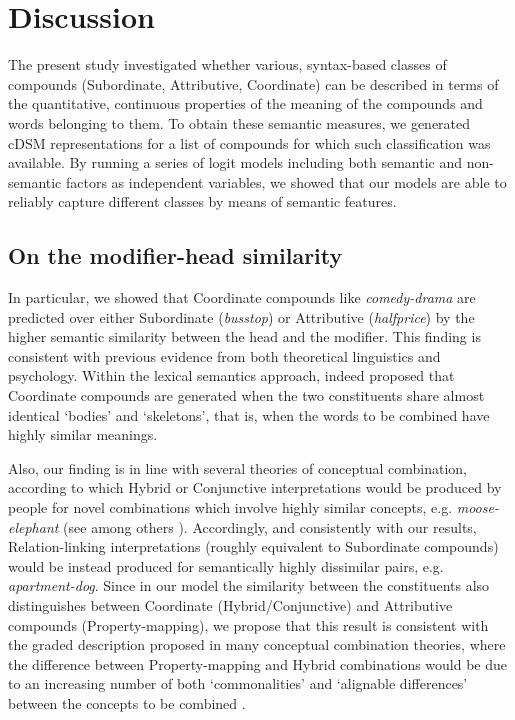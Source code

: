 \documentclass[output=paper]{langsci/langscibook}
\begin{document}
\section{Discussion}
\label{sec:pez:discussion}

The present study investigated whether various, syntax-based classes of compounds (Subordinate, Attributive, Coordinate) can be described in terms of the quantitative, continuous properties of the meaning of the compounds and words belonging to them. To obtain these semantic measures, we generated cDSM representations for a list of compounds for which such classification was available. By running a series of logit models including both semantic and non-semantic factors as independent variables, we showed that our models are able to reliably capture different classes by means of semantic features.

\subsection{On the modifier-head similarity}

In particular, we showed that Coordinate compounds like \emph{comedy-drama} are predicted over either Subordinate (\emph{busstop}) or Attributive (\emph{halfprice}) by the higher semantic similarity between the head and the modifier. This finding is consistent with previous evidence from both theoretical linguistics and psychology. Within the lexical semantics approach, \cite{lieber5OHC} indeed proposed that Coordinate compounds are generated when the two constituents share almost identical `bodies' and `skeletons', that is, when the words to be combined have highly similar meanings.

Also, our finding is in line with several theories of conceptual combination, according to which Hybrid or Conjunctive interpretations would be produced by people for novel combinations which involve highly similar concepts, e.g. \emph{moose-elephant} (see among others \citealt{wisniewski1996}). Accordingly, and consistently with our results, Relation-linking interpretations (roughly equivalent to Subordinate compounds) would be instead produced for semantically highly dissimilar pairs, e.g. \emph{apartment-dog}. Since in our model the similarity between the constituents also distinguishes between Coordinate (Hybrid/Conjunctive) and Attributive compounds (Property-mapping), we propose that this result is consistent with the graded description proposed in many conceptual combination theories, where the difference between Property-mapping and Hybrid combinations would be due to an increasing number of both `commonalities' and `alignable differences' between the concepts to be combined \citep{wisniewski1996}.
\end{document}
